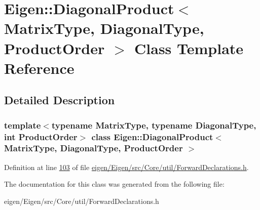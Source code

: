 \hypertarget{class_eigen_1_1_diagonal_product}{}\section{Eigen\+:\+:Diagonal\+Product$<$ Matrix\+Type, Diagonal\+Type, Product\+Order $>$ Class Template Reference}
\label{class_eigen_1_1_diagonal_product}


\subsection{Detailed Description}
\subsubsection*{template$<$typename Matrix\+Type, typename Diagonal\+Type, int Product\+Order$>$\newline
class Eigen\+::\+Diagonal\+Product$<$ Matrix\+Type, Diagonal\+Type, Product\+Order $>$}



Definition at line \hyperlink{eigen_2_eigen_2src_2_core_2util_2_forward_declarations_8h_source_l00103}{103} of file \hyperlink{eigen_2_eigen_2src_2_core_2util_2_forward_declarations_8h_source}{eigen/\+Eigen/src/\+Core/util/\+Forward\+Declarations.\+h}.



The documentation for this class was generated from the following file\+:\begin{DoxyCompactItemize}
\item 
eigen/\+Eigen/src/\+Core/util/\+Forward\+Declarations.\+h\end{DoxyCompactItemize}
